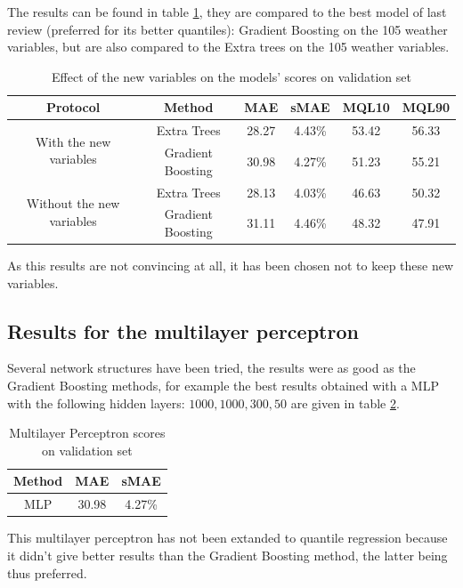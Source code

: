\documentclass[a4paper, 12pt]{article}
\begin{document}
The results can be found in table \ref{tab:new_variables_gb}, they are compared to the best model of last review (preferred for its better quantiles): Gradient Boosting on the 105 weather variables, but are also compared to the Extra trees on the 105 weather variables.

\begin{table}[H]
    \centering
    \begin{tabular}{|c|c|c|c|c|c|}
        \hline
        Protocol & Method & MAE & sMAE & MQL10 & MQL90 \\ \hline
        \multirow{2}{*}{With the new variables} & Extra Trees & 28.27 & 4.43\% & 53.42 & 56.33 \\ \cline{2-6}
         & Gradient Boosting & 30.98 & 4.27\% & 51.23 & 55.21 \\ \hline
        \multirow{2}{*}{Without the new variables} & Extra Trees & 28.13 & 4.03\% & 46.63 & 50.32 \\ \cline{2-6}
         & Gradient Boosting & 31.11 & 4.46\% & 48.32 & 47.91 \\ \hline
    \end{tabular}
    \caption{Effect of the new variables on the models' scores on validation set}
    \label{tab:new_variables_gb}
\end{table}

As this results are not convincing at all, it has been chosen not to keep these new variables.

\subsection{Results for the multilayer perceptron}

Several network structures have been tried, the results were as good as the Gradient Boosting methods, for example the best results obtained with a MLP with the following hidden layers: $1000, 1000, 300, 50$ are given in table \ref{tab:mlp}.

\begin{table}[]
    \centering
    \begin{tabular}{|c|c|c|}
        \hline 
        Method & MAE & sMAE \\ \hline
        MLP & 30.98 & 4.27\%  \\ \hline
    \end{tabular}
    \caption{Multilayer Perceptron scores on validation set}
    \label{tab:mlp}
\end{table}

This multilayer perceptron has not been extanded to quantile regression because it didn't give better results than the Gradient Boosting method, the latter being thus preferred.
\end{document}
